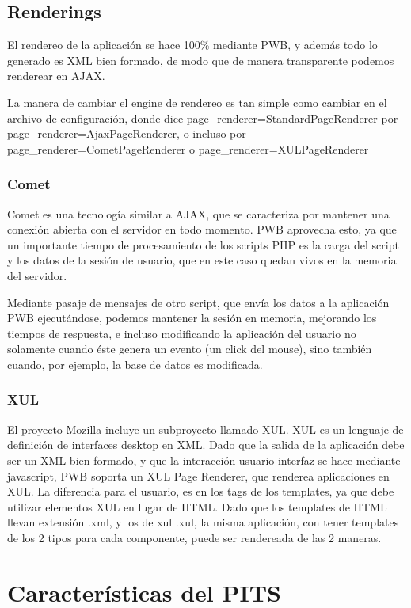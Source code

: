 \subsection{Renderings}
\label{sub-render}
El rendereo de la aplicación se hace 100\% mediante PWB, y además todo lo generado es XML bien formado, de modo que de manera transparente podemos renderear en AJAX.

La manera de cambiar el engine de rendereo es tan simple como cambiar en el archivo de configuración, donde dice page\_renderer=StandardPageRenderer por page\_renderer=AjaxPageRenderer, o incluso por page\_renderer=CometPageRenderer o page\_renderer=XULPageRenderer

\subsubsection{Comet}

Comet es una tecnología similar a AJAX, que se caracteriza por mantener una conexión abierta con el servidor
en todo momento. PWB aprovecha esto, ya que un importante tiempo de procesamiento de los scripts PHP es la
carga del script y los datos de la sesión de usuario, que en este caso quedan vivos en la memoria del servidor.

Mediante pasaje de mensajes de otro script, que envía los datos a la aplicación PWB ejecutándose, podemos
mantener la sesión en memoria, mejorando los tiempos de respuesta, e incluso modificando la aplicación del
usuario no solamente cuando éste genera un evento (un click del mouse), sino también cuando, por ejemplo, la base
de datos es modificada.

\subsubsection{XUL}

El proyecto Mozilla incluye un subproyecto llamado XUL. XUL es un lenguaje de definición de interfaces desktop
en XML. Dado que la salida de la aplicación debe ser un XML bien formado, y que la interacción usuario-interfaz
se hace mediante javascript, PWB soporta un XUL Page Renderer, que renderea aplicaciones en XUL. La
diferencia para el usuario, es en los tags de los templates, ya que debe utilizar elementos XUL en lugar de
HTML. Dado que los templates de HTML llevan extensión .xml, y los de xul .xul, la misma aplicación, con tener
templates de los 2 tipos para cada componente, puede ser rendereada de las 2 maneras.

\section{Características del PITS}

